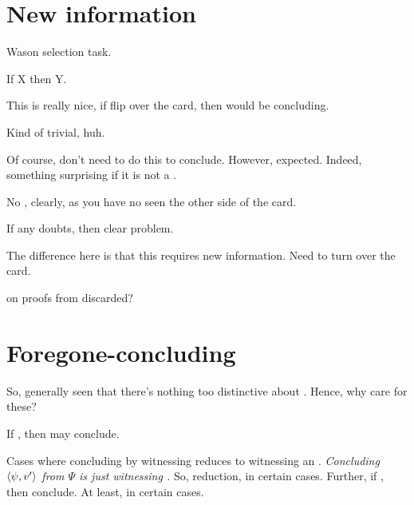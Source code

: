 \section{New information}

\begin{note}
  \begin{scenario}
    Wason selection task.

    If X then Y.
  \end{scenario}

  This is really nice, if flip over the card, then would be concluding.

  Kind of trivial, huh.

  Of course, don't need to do this to conclude.
  However, expected.
  Indeed, something surprising if it is not a \fc{}.

  No \wit{}, clearly, as you have no seen the other side of the card.

  If any doubts, then clear problem.

  The difference here is that this requires new information.
  Need to turn over the card.
\end{note}

\begin{note}
  \citeauthor{Easwaran:2009tm} on proofs from discarded?
\end{note}

\section{Foregone-concluding}

\begin{note}
  So, generally seen that there's nothing too distinctive about .
  Hence, why care for these?

  \begin{idea}
    \label{idea:reassignment}
    If \fc{}, then may conclude.
  \end{idea}

  Cases where concluding by witnessing reduces to witnessing an \fc{}.
  \emph{Concluding \(\langle \psi, v' \rangle\) from \(\Psi\) is just witnessing \fc{}.}
  So, reduction, in certain cases.
  Further, if \fc{}, then conclude.
  At least, in certain cases.
\end{note}





